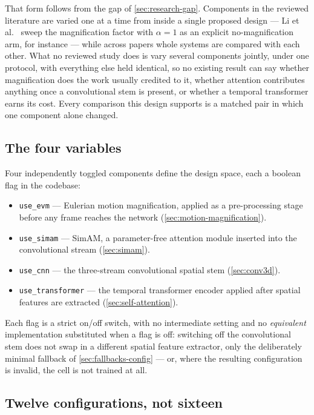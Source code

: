 That form follows from the gap of \autoref{sec:research-gap}. Components in the reviewed literature are varied one at a time from inside a single proposed design --- Li et al.~\cite{liX2018} sweep the magnification factor with $\alpha = 1$ as an explicit no-magnification arm, for instance --- while across papers whole systems are compared with each other. What no reviewed study does is vary several components jointly, under one protocol, with everything else held identical, so no existing result can say whether magnification does the work usually credited to it, whether attention contributes anything once a convolutional stem is present, or whether a temporal transformer earns its cost. Every comparison this design supports is a matched pair in which one component alone changed.

\subsection{The four variables}
\label{sec:four-variables}

Four independently toggled components define the design space, each a boolean flag in the codebase:

\begin{itemize}
	\item \texttt{use\_evm} --- Eulerian motion magnification, applied as a pre-processing stage before any frame reaches the network (\autoref{sec:motion-magnification}).
	\item \texttt{use\_simam} --- SimAM, a parameter-free attention module inserted into the convolutional stream (\autoref{sec:simam}).
	\item \texttt{use\_cnn} --- the three-stream convolutional spatial stem (\autoref{sec:conv3d}).
	\item \texttt{use\_transformer} --- the temporal transformer encoder applied after spatial features are extracted (\autoref{sec:self-attention}).
\end{itemize}

Each flag is a strict on/off switch, with no intermediate setting and no \textit{equivalent} implementation substituted when a flag is off: switching off the convolutional stem does not swap in a different spatial feature extractor, only the deliberately minimal fallback of \autoref{sec:fallbacks-config} --- or, where the resulting configuration is invalid, the cell is not trained at all.

\subsection{Twelve configurations, not sixteen}
\label{sec:twelve-configs}

